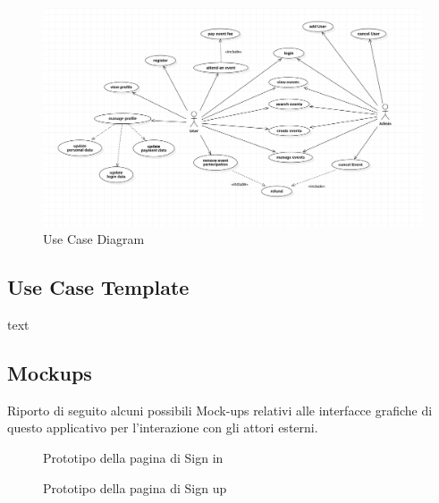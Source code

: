 \documentclass[11pt]{article}
\begin{document}
            \begin{figure}[H]
                \centering
                \includegraphics[width=\textwidth]{use_case_diagram/use_case_diagram}
                \caption{Use Case Diagram}
                \label{fig:use-case-diagram}
            \end{figure}

        \subsection{Use Case Template} \label{subsec:use-case-template}

            text

        \subsection{Mockups} \label{subsec:mockups}

            Riporto di seguito alcuni possibili Mock-ups relativi alle interfacce grafiche di questo applicativo per l’interazione con gli attori esterni.


            \begin{figure}[H]
                \centering
                \setlength{\fboxsep}{10pt} %
                \caption{Prototipo della pagina di Sign in}
                \label{fig:mockup-1.1}
            \end{figure}

            \setlength{\fboxsep}{10pt}
            \begin{figure}[H]
                \centering
                \setlength{\fboxsep}{10pt} %
                \caption{Prototipo della pagina di Sign up}
                \label{fig:mockup-1.2}
            \end{figure}
\end{document}
